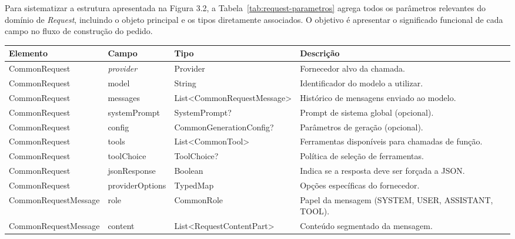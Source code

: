     Para sistematizar a estrutura apresentada na Figura 3.2, a Tabela~\ref{tab:request-parametros} agrega todos os parâmetros relevantes do domínio de \textit{Request}, incluindo o objeto principal e os tipos diretamente associados. O objetivo é apresentar o significado funcional de cada campo no fluxo de construção do pedido.


    \begin{table}[H]
    \centering
    \scriptsize %
    \setlength{\tabcolsep}{3.5pt} %
    \renewcommand{\arraystretch}{1.15}
    \begin{tabularx}{\textwidth}{|>{\raggedright\arraybackslash}p{2.9cm}|>{\raggedright\arraybackslash}p{2.6cm}|>{\raggedright\arraybackslash}p{2.6cm}|>{\raggedright\arraybackslash}X|}
    \hline
    \textbf{Elemento} & \textbf{Campo} & \textbf{Tipo} & \textbf{Descrição} \\ \hline

    CommonRequest & \textit{provider} & Provider & Fornecedor alvo da chamada. \\ \hline
    CommonRequest & model & String & Identificador do modelo a utilizar. \\ \hline
    CommonRequest & messages & List<Common\-RequestMessage> & Histórico de mensagens enviado ao modelo. \\ \hline
    CommonRequest & systemPrompt & SystemPrompt? & Prompt de sistema global (opcional). \\ \hline
    CommonRequest & config & Common\-GenerationConfig? & Parâmetros de geração (opcional). \\ \hline
    CommonRequest & tools & List<CommonTool> & Ferramentas disponíveis para chamadas de função. \\ \hline
    CommonRequest & toolChoice & ToolChoice? & Política de seleção de ferramentas. \\ \hline
    CommonRequest & jsonResponse & Boolean & Indica se a resposta deve ser forçada a JSON. \\ \hline
    CommonRequest & providerOptions & TypedMap & Opções específicas do fornecedor. \\ \hline

    CommonRequest\-Message & role & CommonRole & Papel da mensagem (SYSTEM, USER, ASSISTANT, TOOL). \\ \hline
    CommonRequest\-Message & content & List<Request\-ContentPart> & Conteúdo segmentado da mensagem. \\ \hline


\end{tabularx}
\end{table}
